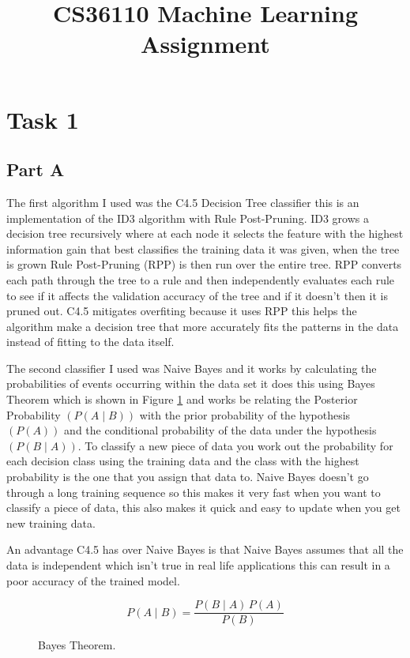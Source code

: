 \documentclass[10pt]{article}
\title {CS36110 Machine Learning Assignment}
\date{}                                           %
\begin{document}
\maketitle

\section*{Task 1}

\subsection*{Part A}
The first algorithm I used was the C4.5 Decision Tree classifier this is an implementation of the ID3 algorithm with Rule Post-Pruning. ID3 grows a decision tree recursively where at each node it selects the feature with the highest information gain that best classifies the training data it was given, when the tree is grown Rule Post-Pruning (RPP) is then run over the entire tree. RPP converts each path through the tree to a rule and then independently evaluates each rule to see if it affects the validation accuracy of the tree and if it doesn't then it is pruned out. C4.5 mitigates overfiting because it uses RPP this helps the algorithm make a decision tree that more accurately fits the patterns in the data instead of fitting to the data itself.

The second classifier I used was Naive Bayes and it works by calculating the probabilities of events occurring within the data set it does this using Bayes Theorem which is shown in Figure \ref{fig:bayes} and works be relating the Posterior Probability $(P(A \mid B))$ with the prior probability of the hypothesis $(P(A))$ and the conditional probability of the data under the hypothesis $(P(B \mid A))$. To classify a new piece of data you work out the probability for each decision class using the training data and the class with the highest probability is the one that you assign that data to. Naive Bayes doesn't go through a long training sequence so this makes it very fast when you want to classify a piece of data, this also makes it quick and easy to update when you get new training data.

An advantage C4.5 has over Naive Bayes is that Naive Bayes assumes that all the data is independent which isn't true in real life applications this can result in a poor accuracy of the trained model.


\begin{figure}[h]
    \centering
    $$ P(A \mid B) = \frac{P(B \mid A) \, P(A)}{P(B)} $$
    \caption{Bayes Theorem.}
    \label{fig:bayes}
\end{figure}
\end{document}
